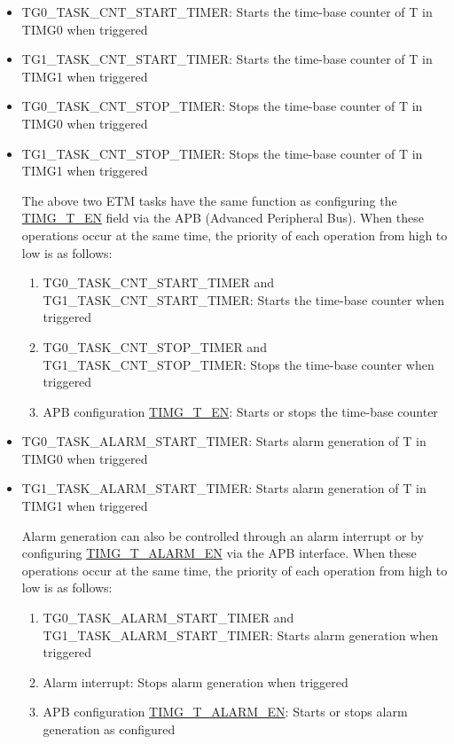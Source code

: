 \documentclass[main\_\_EN.tex]{subfiles}
\begin{document}
\begin{itemize}
\item TG0\_TASK\_CNT\_START\_TIMER: Starts the time-base counter of T in TIMG0 when triggered
\item TG1\_TASK\_CNT\_START\_TIMER: Starts the time-base counter of T in TIMG1 when triggered
\item TG0\_TASK\_CNT\_STOP\_TIMER: Stops the time-base counter of T in TIMG0 when triggered
\item TG1\_TASK\_CNT\_STOP\_TIMER: Stops the time-base counter of T in TIMG1 when triggered

\begin{tiplisting}
The above two ETM tasks have the same function as configuring the \hyperref[fielddesc:TIMGTXEN]{TIMG\_T\_EN} field via the APB (Advanced Peripheral Bus). When these operations occur at the same time, the priority of each operation from high to low is as follows:

\begin{enumerate}
    \item TG0\_TASK\_CNT\_START\_TIMER and TG1\_TASK\_CNT\_START\_TIMER: Starts the time-base counter when triggered
    \item TG0\_TASK\_CNT\_STOP\_TIMER and TG1\_TASK\_CNT\_STOP\_TIMER: Stops the time-base counter when triggered
    \item APB configuration \hyperref[fielddesc:TIMGTXEN]{TIMG\_T\_EN}: Starts or stops the time-base counter
\end{enumerate}
\end{tiplisting}

\item TG0\_TASK\_ALARM\_START\_TIMER: Starts alarm generation of T in TIMG0 when triggered
\item TG1\_TASK\_ALARM\_START\_TIMER: Starts alarm generation of T in TIMG1 when triggered

\begin{tiplisting}
Alarm generation can also be controlled through an alarm interrupt or by configuring \hyperref[fielddesc:TIMGTXALARMEN]{TIMG\_T\_ALARM\_EN} via the APB interface. When these operations occur at the same time, the priority of each operation from high to low is as follows:

\begin{enumerate}
    \item TG0\_TASK\_ALARM\_START\_TIMER and TG1\_TASK\_ALARM\_START\_TIMER: Starts alarm generation when triggered
    \item Alarm interrupt: Stops alarm generation when triggered
    \item APB configuration \hyperref[fielddesc:TIMGTXALARMEN]{TIMG\_T\_ALARM\_EN}: Starts or stops alarm generation as configured
\end{enumerate}
\end{tiplisting}


\end{itemize}
\end{document}
